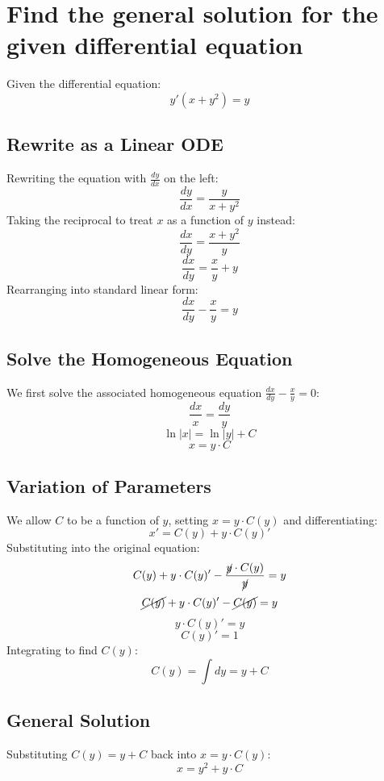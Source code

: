 \documentclass[11pt]{article}
\begin{document}
\newpage
\section{Find the general solution for the given differential equation}
\label{sec:org0e88e47}
Given the differential equation:
\[
y' \left( x + y^2 \right) = y
\]
\subsection{Rewrite as a Linear ODE}
\label{sec:org7560d2a}
Rewriting the equation with \(\frac{dy}{dx}\) on the left:
\[
\frac{dy}{dx} = \frac{y}{x+y^2}
\]
Taking the reciprocal to treat \(x\) as a function of \(y\) instead:
\[
\frac{dx}{dy} = \frac{x+y^2}{y}
\]
\[
\frac{dx}{dy} = \frac{x}{y} + y
\]
Rearranging into standard linear form:
\[
\frac{dx}{dy} - \frac{x}{y} = y
\]
\subsection{Solve the Homogeneous Equation}
\label{sec:org8a626f3}
We first solve the associated homogeneous equation \(\frac{dx}{dy} - \frac{x}{y} = 0\):
\[
\frac{dx}{x} = \frac{dy}{y}
\]
\[
\ln{\left| x \right|} = \ln{\left| y \right|} + C
\]
\[
x = y \cdot C
\]
\subsection{Variation of Parameters}
\label{sec:orge814202}
We allow \(C\) to be a function of \(y\), setting \(x = y \cdot C(y)\) and differentiating:
\[
x' = C(y) + y \cdot C(y)'
\]
Substituting into the original equation:
\[
C(y) + y \cdot C(y)' - \frac{\cancel{y} \cdot C(y)}{\cancel{y}} = y
\]
\[
\cancel{C(y)} + y \cdot C(y)' - \cancel{C(y)} = y
\]
\[
y \cdot C(y)' = y
\]
\[
C(y)' = 1
\]
Integrating to find \(C(y)\):
\[
C(y) = \int{dy} = y + C
\]
\subsection{General Solution}
\label{sec:orga1350b7}
Substituting \(C(y) = y + C\) back into \(x = y \cdot C(y)\):
\[
\boxed{x = y^2 + y \cdot C}
\]
\end{document}
